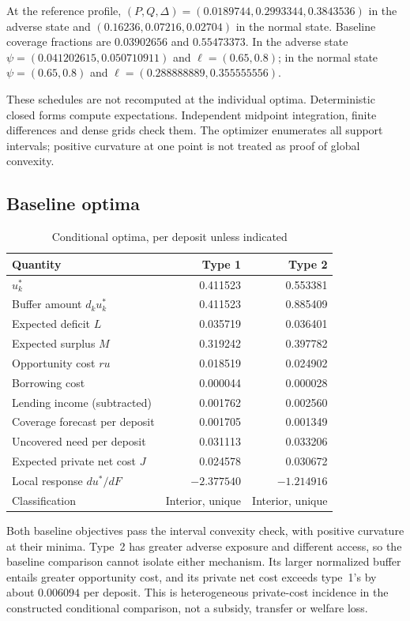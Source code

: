 \documentclass[11pt]{article}
\theoremstyle{definition}
\begin{document}
At the reference profile, $(P,Q,\Delta)=(0.0189744,0.2993344,0.3843536)$ in the adverse state and $(0.16236,0.07216,0.02704)$ in the normal state. Baseline coverage fractions are $0.03902656$ and $0.55473373$. In the adverse state $\psi=(0.041202615,0.050710911)$ and $\ell=(0.65,0.8)$; in the normal state $\psi=(0.65,0.8)$ and $\ell=(0.288888889,0.355555556)$.

These schedules are not recomputed at the individual optima. Deterministic closed forms compute expectations. Independent midpoint integration, finite differences and dense grids check them. The optimizer enumerates all support intervals; positive curvature at one point is not treated as proof of global convexity.

\subsection{Baseline optima}
\begin{table}[htbp]
\centering
\caption{Conditional optima, per deposit unless indicated}\label{tab:optima}
\begin{tabular}{lrr}
\toprule
Quantity & Type 1 & Type 2\\
\midrule
$u_k^*$ & 0.411523 & 0.553381\\
Buffer amount $d_ku_k^*$ & 0.411523 & 0.885409\\
Expected deficit $L$ & 0.035719 & 0.036401\\
Expected surplus $M$ & 0.319242 & 0.397782\\
Opportunity cost $ru$ & 0.018519 & 0.024902\\
Borrowing cost & 0.000044 & 0.000028\\
Lending income (subtracted) & 0.001762 & 0.002560\\
Coverage forecast per deposit & 0.001705 & 0.001349\\
Uncovered need per deposit & 0.031113 & 0.033206\\
Expected private net cost $J$ & 0.024578 & 0.030672\\
Local response $du^*/dF$ & $-2.377540$ & $-1.214916$\\
Classification & Interior, unique & Interior, unique\\
\bottomrule
\end{tabular}
\end{table}

Both baseline objectives pass the interval convexity check, with positive curvature at their minima. Type~2 has greater adverse exposure and different access, so the baseline comparison cannot isolate either mechanism. Its larger normalized buffer entails greater opportunity cost, and its private net cost exceeds type~1's by about $0.006094$ per deposit. This is heterogeneous private-cost incidence in the constructed conditional comparison, not a subsidy, transfer or welfare loss.
\end{document}

